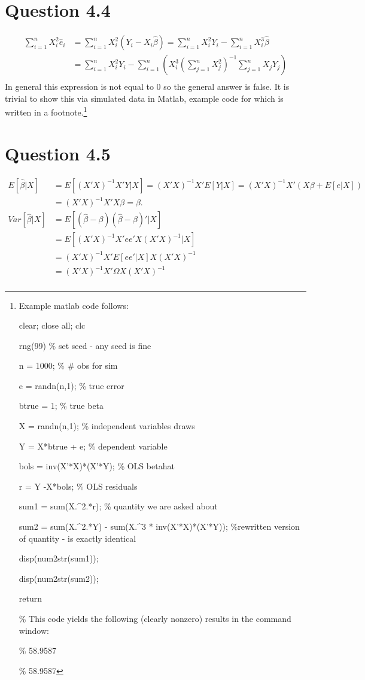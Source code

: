 \documentclass[11pt]{article} %
\begin{document}
\section{Question 4.4}
\begin{align*}
\sum_{i=1}^n X_i^2\hat{e}_i &=\sum_{i=1}^n X_i^2(Y_i - X_i\hat{\beta}) = \sum_{i=1}^n X_i^2Y_i -\sum_{i=1}^n X_i^3\hat{\beta}\\
&= \sum_{i=1}^n X_i^2Y_i -\sum_{i=1}^n\left( X_i^3\left(\sum_{j=1}^n X_j^2\right)^{-1}\sum_{j=1}^nX_jY_j\right)\\
\end{align*}
In general this expression is not equal to 0 so the general answer is false. It is trivial to show this via simulated data in Matlab, example code for which is written in a footnote.\footnote{Example matlab code follows:

clear; close all; clc 

rng(99) \% set seed - any seed is fine 

n = 1000; \% \# obs for sim

e = randn(n,1); \% true error

btrue = 1; \% true beta

X = randn(n,1); \% independent variables draws

Y = X*btrue + e; \% dependent variable

bols = inv(X'*X)*(X'*Y);  \% OLS betahat

r = Y -X*bols; \% OLS residuals

sum1 = sum(X.\^{}2.*r); \% quantity we are asked about

sum2 = sum(X.\^{}2.*Y) - sum(X.\^{}3 * inv(X'*X)*(X'*Y)); \%rewritten version of quantity - is exactly identical

disp(num2str(sum1)); 

disp(num2str(sum2));

return

\% This code yields the following (clearly nonzero) results in the command window:

\% 58.9587

\% 58.9587}

\section{Question 4.5}
\begin{align*}
E[\hat{\beta}|X] &= E[(X'X)^{-1}X'Y|X] = (X'X)^{-1}X'E[Y|X] = (X'X)^{-1}X'(X\beta + E[e|X]) \\
&=  (X'X)^{-1}X'X\beta = \beta. \\
Var[\hat{\beta}|X] &= E[(\hat{\beta} - \beta)(\hat{\beta} - \beta)'|X]\\
&= E[(X'X)^{-1}X'ee'X(X'X)^{-1}|X]\\
&= (X'X)^{-1}X' E[ee'|X]X (X'X)^{-1}\\
&= (X'X)^{-1}X' \Omega X (X'X)^{-1}\\
\end{align*}
\end{document}

